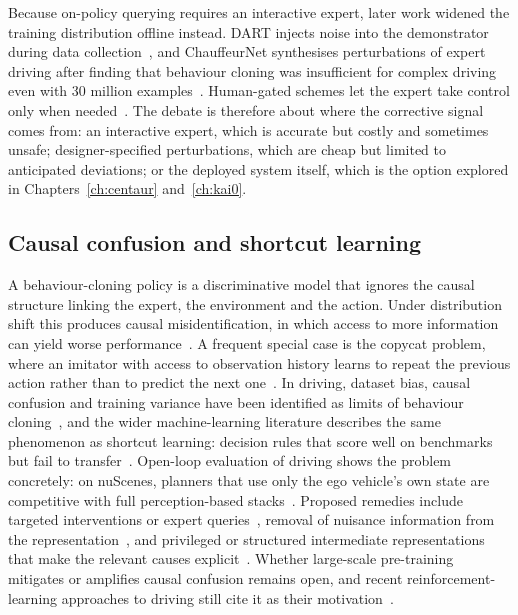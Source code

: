 Because on-policy querying requires an interactive expert, later work widened the training distribution offline instead. DART injects noise into the demonstrator during data collection~\cite{laskey2017dart}, and ChauffeurNet synthesises perturbations of expert driving after finding that behaviour cloning was insufficient for complex driving even with 30 million examples~\cite{bansal2019chauffeurnet}. Human-gated schemes let the expert take control only when needed~\cite{kelly2019hgdagger}. The debate is therefore about where the corrective signal comes from: an interactive expert, which is accurate but costly and sometimes unsafe; designer-specified perturbations, which are cheap but limited to anticipated deviations; or the deployed system itself, which is the option explored in Chapters~\ref{ch:centaur} and~\ref{ch:kai0}.

\subsection{Causal confusion and shortcut learning}

A behaviour-cloning policy is a discriminative model that ignores the causal structure linking the expert, the environment and the action. Under distribution shift this produces causal misidentification, in which access to more information can yield worse performance~\cite{dehaan2019causal}. A frequent special case is the copycat problem, where an imitator with access to observation history learns to repeat the previous action rather than to predict the next one~\cite{wen2020fighting}. In driving, dataset bias, causal confusion and training variance have been identified as limits of behaviour cloning~\cite{codevilla2019exploring}, and the wider machine-learning literature describes the same phenomenon as shortcut learning: decision rules that score well on benchmarks but fail to transfer~\cite{geirhos2020shortcut}. Open-loop evaluation of driving shows the problem concretely: on nuScenes, planners that use only the ego vehicle's own state are competitive with full perception-based stacks~\cite{zhai2023rethinking,li2024ego}. Proposed remedies include targeted interventions or expert queries~\cite{dehaan2019causal}, removal of nuisance information from the representation~\cite{wen2020fighting}, and privileged or structured intermediate representations that make the relevant causes explicit~\cite{chen2019lbc}. Whether large-scale pre-training mitigates or amplifies causal confusion remains open, and recent reinforcement-learning approaches to driving still cite it as their motivation~\cite{gao2025rad}.

